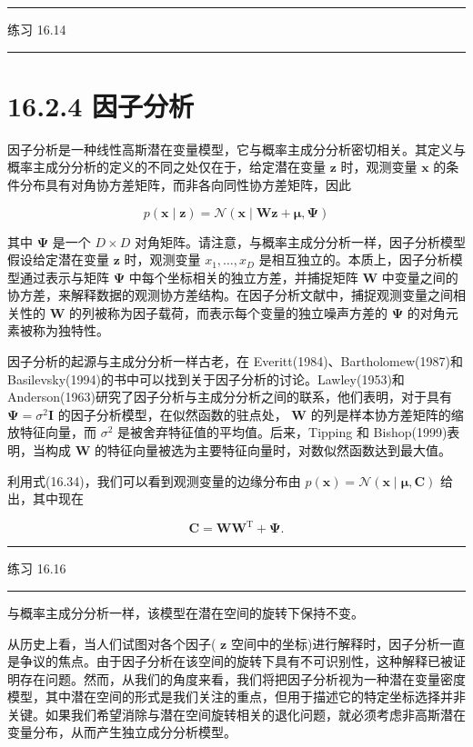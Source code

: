 \documentclass[10pt]{article}
\newcommand{\HRule}{\begin{center}\rule{0.9\linewidth}{0.2mm}\end{center}}
\begin{document}
\HRule

练习 16.14

\HRule

\section*{16.2.4 因子分析}

因子分析是一种线性高斯潜在变量模型，它与概率主成分分析密切相关。其定义与概率主成分分析的定义的不同之处仅在于，给定潜在变量 \(\mathbf{z}\) 时，观测变量 \(\mathbf{x}\) 的条件分布具有对角协方差矩阵，而非各向同性协方差矩阵，因此

\[
p\left( {\mathbf{x} \mid  \mathbf{z}}\right)  = \mathcal{N}\left( {\mathbf{x} \mid  \mathbf{W}\mathbf{z} + \mathbf{\mu },\mathbf{\Psi }}\right)  \tag{16.53}
\]

其中 \(\mathbf{\Psi }\) 是一个 \(D \times  D\) 对角矩阵。请注意，与概率主成分分析一样，因子分析模型假设给定潜在变量 \(\mathbf{z}\) 时，观测变量 \({x}_{1},\ldots ,{x}_{D}\) 是相互独立的。本质上，因子分析模型通过表示与矩阵 \(\mathbf{\Psi }\) 中每个坐标相关的独立方差，并捕捉矩阵 \(\mathbf{W}\) 中变量之间的协方差，来解释数据的观测协方差结构。在因子分析文献中，捕捉观测变量之间相关性的 \(\mathbf{W}\) 的列被称为因子载荷，而表示每个变量的独立噪声方差的 \(\mathbf{\Psi }\) 的对角元素被称为独特性。

因子分析的起源与主成分分析一样古老，在 Everitt(1984)、Bartholomew(1987)和 Basilevsky(1994)的书中可以找到关于因子分析的讨论。Lawley(1953)和 Anderson(1963)研究了因子分析与主成分分析之间的联系，他们表明，对于具有 \(\mathbf{\Psi } = {\sigma }^{2}\mathbf{I}\) 的因子分析模型，在似然函数的驻点处， \(\mathbf{W}\) 的列是样本协方差矩阵的缩放特征向量，而 \({\sigma }^{2}\) 是被舍弃特征值的平均值。后来，Tipping 和 Bishop(1999)表明，当构成 \(\mathbf{W}\) 的特征向量被选为主要特征向量时，对数似然函数达到最大值。

利用式(16.34)，我们可以看到观测变量的边缘分布由 \(p\left( \mathbf{x}\right)  = \mathcal{N}\left( {\mathbf{x} \mid  \mathbf{\mu },\mathbf{C}}\right)\) 给出，其中现在

\[
\mathbf{C} = \mathbf{W}{\mathbf{W}}^{\mathrm{T}} + \mathbf{\Psi }. \tag{16.54}
\]

\HRule

练习 16.16

\HRule

与概率主成分分析一样，该模型在潜在空间的旋转下保持不变。

从历史上看，当人们试图对各个因子( \(\mathbf{z}\) 空间中的坐标)进行解释时，因子分析一直是争议的焦点。由于因子分析在该空间的旋转下具有不可识别性，这种解释已被证明存在问题。然而，从我们的角度来看，我们将把因子分析视为一种潜在变量密度模型，其中潜在空间的形式是我们关注的重点，但用于描述它的特定坐标选择并非关键。如果我们希望消除与潜在空间旋转相关的退化问题，就必须考虑非高斯潜在变量分布，从而产生独立成分分析模型。
\end{document}
